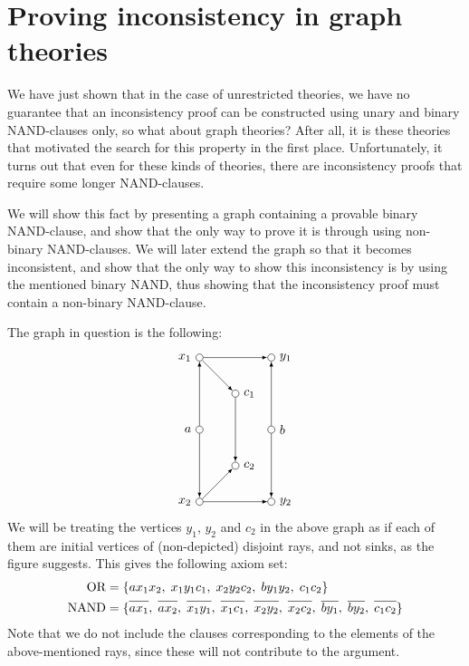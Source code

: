 \section{Proving inconsistency in graph theories}
\label{sec:Proving inconsistency in graph theories}
We have just shown that in the case of unrestricted theories, we have no guarantee that an inconsistency proof can be constructed using unary and binary NAND-clauses only, so what about graph theories?
After all, it is these theories that motivated the search for this property in the first place.
Unfortunately, it turns out that even for these kinds of theories, there are inconsistency proofs that require some longer NAND-clauses.

We will show this fact by presenting a graph containing a provable binary NAND-clause, and show that the only way to prove it is through using non-binary NAND-clauses.
We will later extend the graph so that it becomes inconsistent, and show that the only way to show this inconsistency is by using the mentioned binary NAND, thus showing that the inconsistency proof must contain a non-binary NAND-clause.

The graph in question is the following:
\[
  \begin{tikzpicture}
    [
    point/.style={circle,draw,inner sep=0pt,minimum size=2mm},
    collection/.style={thick,rectangle,draw,inner sep=0pt,minimum height=14mm, minimum width= 9mm}
    ]
    \node (a) at (0,2) [point,label=left:$a$] {};
    \node (x1) at (0,4) [point,label=left:$x_1$] {};
    \node (x2) at (0,0) [point,label=left:$x_2$] {};
    \node (b) at (2,2) [point,label=right:$b$] {};
    \node (y1) at (2,4) [point,label=right:$y_1$] {};
    \node (y2) at (2,0) [point,label=right:$y_2$] {};
    \node (c1) at (1,3) [point,label=right:$c_1$] {};
    \node (c2) at (1,1) [point,label=right:$c_2$] {};
    \draw [-latex] (a) to (x1);
    \draw [-latex] (a) to (x2);
    \draw [-latex] (b) to (y1);
    \draw [-latex] (b) to (y2);
    \draw [-latex] (x1) to (y1);
    \draw [-latex] (x1) to (c1);
    \draw [-latex] (x2) to (y2);
    \draw [-latex] (x2) to (c2);
    \draw [-latex] (c1) to (c2);
  \end{tikzpicture}
\]
We will be treating the vertices $y_1$, $y_2$ and $c_2$ in the above graph as if each of them are initial vertices of (non-depicted) disjoint rays, and not sinks, as the figure suggests.
This gives the following axiom set:
\begin{align}
  \text{OR} &= \{ ax_1x_2,\; x_1y_1c_1,\; x_2y_2c_2,\; by_1y_2,\; c_1c_2 \}\\
  \text{NAND} &= \{ \ol{ax_1},\; \ol{ax_2},\; \ol{x_1y_1},\; \ol{x_1c_1},\; \ol{x_2y_2},\; \ol{x_2c_2},\; \ol{by_1},\; \ol{by_2},\; \ol{c_1c_2} \}
\end{align}
Note that we do not include the clauses corresponding to the elements of the above-mentioned rays, since these will not contribute to the argument.


